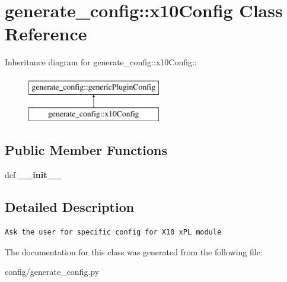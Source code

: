 \hypertarget{classgenerate__config_1_1x10Config}{
\section{generate\_\-config::x10Config Class Reference}
\label{classgenerate__config_1_1x10Config}
}
Inheritance diagram for generate\_\-config::x10Config::\begin{figure}[H]
\begin{center}
\leavevmode
\includegraphics[height=2cm]{classgenerate__config_1_1x10Config}
\end{center}
\end{figure}
\subsection*{Public Member Functions}
\begin{CompactItemize}
\item 
\hypertarget{classgenerate__config_1_1x10Config_ebb61db62b6f7df09e9061255514bb70}{
def \textbf{\_\-\_\-init\_\-\_\-}}
\label{classgenerate__config_1_1x10Config_ebb61db62b6f7df09e9061255514bb70}

\end{CompactItemize}


\subsection{Detailed Description}


\footnotesize\begin{verbatim}
Ask the user for specific config for X10 xPL module
\end{verbatim}
\normalsize
 

The documentation for this class was generated from the following file:\begin{CompactItemize}
\item 
config/generate\_\-config.py\end{CompactItemize}
